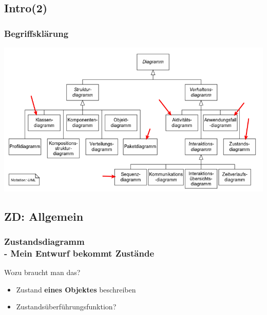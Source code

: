 \documentclass[18pt]{beamer}
\begin{document}
	\subsection{Intro(2)}
	\begin{frame}
		\frametitle{Begriffsklärung}
		\includegraphics[scale=0.35]{./pics/tut1/uml_diagrams.png}
	\end{frame}

	\subsection{ZD: Allgemein}
	\begin{frame}
		\frametitle{Zustandsdiagramm \\ - Mein Entwurf bekommt Zustände}
		\begin{block}{Wozu braucht man das?}
			\pause
			\begin{itemize}
				\item Zustand \textbf{eines Objektes} beschreiben
				\item Zustandsüberführungsfunktion?
			\end{itemize}
		\end{block}
	\end{frame}
\end{document}
